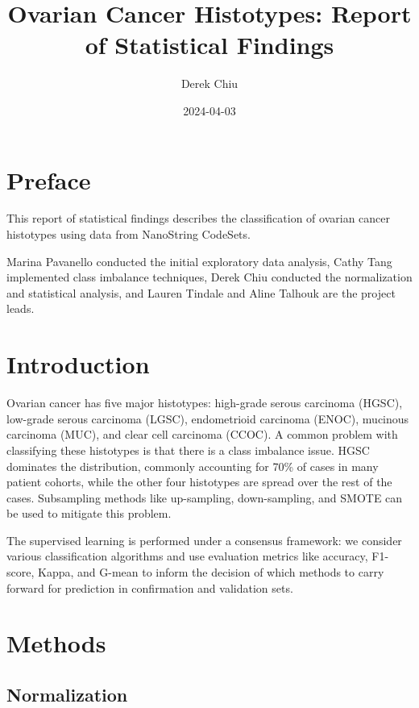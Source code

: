 \documentclass[
]{report}
\title{Ovarian Cancer Histotypes: Report of Statistical Findings}
\author{Derek Chiu}
\date{2024-04-03}
\begin{document}
\maketitle

{
\hypersetup{linkcolor=}
\setcounter{tocdepth}{1}
\tableofcontents
}
\listoffigures
\listoftables
\hypertarget{preface}{%
\chapter*{Preface}\label{preface}}

This report of statistical findings describes the classification of ovarian cancer histotypes using data from NanoString CodeSets.

Marina Pavanello conducted the initial exploratory data analysis, Cathy Tang implemented class imbalance techniques, Derek Chiu conducted the normalization and statistical analysis, and Lauren Tindale and Aline Talhouk are the project leads.

\hypertarget{introduction}{%
\chapter{Introduction}\label{introduction}}

Ovarian cancer has five major histotypes: high-grade serous carcinoma (HGSC), low-grade serous carcinoma (LGSC), endometrioid carcinoma (ENOC), mucinous carcinoma (MUC), and clear cell carcinoma (CCOC). A common problem with classifying these histotypes is that there is a class imbalance issue. HGSC dominates the distribution, commonly accounting for 70\% of cases in many patient cohorts, while the other four histotypes are spread over the rest of the cases. Subsampling methods like up-sampling, down-sampling, and SMOTE can be used to mitigate this problem.

The supervised learning is performed under a consensus framework: we consider various classification algorithms and use evaluation metrics like accuracy, F1-score, Kappa, and G-mean to inform the decision of which methods to carry forward for prediction in confirmation and validation sets.

\hypertarget{methods}{%
\chapter{Methods}\label{methods}}

\hypertarget{normalization}{%
\section{Normalization}\label{normalization}}
\end{document}
